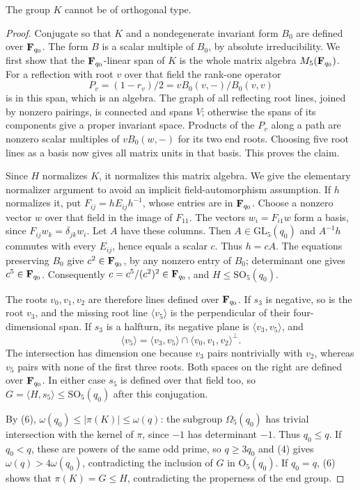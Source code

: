 \documentclass[11pt,a4paper]{article}
\newcommand{\gen}[1]{\langle#1\rangle}\newcommand{\Om}{\Omega}
\begin{document}
\begin{lemma}\label{classical}
The group $K$ cannot be of orthogonal type.
\end{lemma}
\begin{proof}
Conjugate so that $K$ and a nondegenerate invariant form $B_0$ are
defined over $\mathbf F_{q_0}$. The form $B$ is a scalar multiple of $B_0$,
by absolute irreducibility. We first show that the $\mathbf F_{q_0}$-linear
span of $K$ is the whole matrix algebra $M_5(\mathbf F_{q_0})$.
For a reflection with root $v$ over that field the rank-one operator
\[
       P_v=(1-r_v)/2=vB_0(v,-)/B_0(v,v)
\]
is in this span, which is an algebra. The graph of all reflecting
root lines, joined by nonzero pairings, is connected and spans $V$;
otherwise the spans of its components give a proper invariant space.
Products of the $P_v$ along a path are nonzero scalar multiples of
$vB_0(w,-)$ for its two end roots. Choosing five root lines as a
basis now gives all matrix units in that basis. This proves the claim.

Since $H$ normalizes $K$, it normalizes this matrix algebra. We give
the elementary normalizer argument to avoid an implicit field-automorphism
assumption. If $h$ normalizes it, put $F_{ij}=hE_{ij}h^{-1}$, whose
entries are in $\mathbf F_{q_0}$. Choose a nonzero vector $w$ over that
field in the image of $F_{11}$. The vectors $w_i=F_{i1}w$ form a
basis, since $F_{ij}w_k=\delta_{jk}w_i$. Let $A$ have these columns.
Then $A\in\mathrm{GL}_5(q_0)$ and $A^{-1}h$ commutes with every
$E_{ij}$, hence equals a scalar $c$. Thus $h=cA$.
The equations preserving $B_0$ give $c^2\in\mathbf F_{q_0}$, by any
nonzero entry of $B_0$; determinant one gives $c^5\in\mathbf F_{q_0}$.
Consequently $c=c^5/(c^2)^2\in\mathbf F_{q_0}$, and
$H\le\mathrm{SO}_5(q_0)$.

The roots $v_0,v_1,v_2$ are therefore lines defined over $\mathbf F_{q_0}$.
If $s_3$ is negative, so is the root $v_3$, and the missing root
line $\gen{v_5}$ is the perpendicular of their four-dimensional span.
If $s_3$ is a halfturn, its negative plane is
$\gen{v_3,v_5}$, and
\[
 \gen{v_5}=\gen{v_3,v_5}\cap\gen{v_0,v_1,v_2}^{\perp}.       \tag{7}
\]
The intersection has dimension one because $v_3$ pairs nontrivially
with $v_2$, whereas $v_5$ pairs with none of the first three roots.
Both spaces on the right are defined over $\mathbf F_{q_0}$. In either
case $s_5$ is defined over that field too, so
$G=\gen{H,s_5}\le\mathrm{SO}_5(q_0)$ after this conjugation.

By (6), $\omega(q_0)\le|\pi(K)|\le\omega(q)$: the subgroup
$\Om_5(q_0)$ has trivial intersection with the kernel of $\pi$,
since $-1$ has determinant $-1$. Thus $q_0\le q$. If $q_0<q$,
these are powers of the same odd prime, so $q\ge3q_0$ and (4)
gives $\omega(q)>4\omega(q_0)$, contradicting the inclusion of
$G$ in $\mathrm O_5(q_0)$. If $q_0=q$, (6) shows that
$\pi(K)=G\le H$, contradicting the properness of the end group.
\end{proof}
\end{document}
